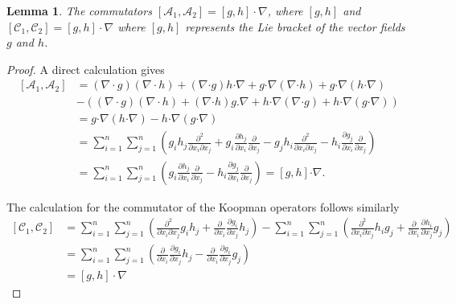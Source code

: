 \documentclass[pdflatex,sn-mathphys]{sn-jnl}%
\newtheorem{lemma}{Lemma}
\theoremstyle{thmstyleone}%
\theoremstyle{thmstyletwo}%
\theoremstyle{thmstylethree}%
\begin{document}
\begin{lemma}
The commutators $[\mathcal{A}_1,\mathcal{A}_2] = [g,h] \cdot \nabla$, where $[g,h]$ and $[\mathcal{C}_1,\mathcal{C}_2] = [g,h] \cdot \nabla$ where $[g,h]$ represents the Lie bracket of the vector fields $g$ and $h$.
\end{lemma}
\begin{proof} A direct calculation gives 
\begin{equation}
\begin{split}
[\mathcal{A}_1,\mathcal{A}_2] &=  (\nabla\cdot g)(\nabla \cdot h) + (\nabla \boldsymbol{\cdot} g) h \boldsymbol{\cdot} \nabla + g\boldsymbol{\cdot} \nabla(\nabla \boldsymbol{\cdot} h) + g \boldsymbol{\cdot} \nabla(h\boldsymbol{\cdot}  \nabla) \\
& -\left((\nabla\cdot g)(\nabla \cdot h) + (\nabla \boldsymbol{\cdot} h)g.\nabla + h \boldsymbol{\cdot} \nabla (\nabla \boldsymbol{\cdot} g) + h \boldsymbol{\cdot} \nabla (g \boldsymbol{\cdot} \nabla)\right) \\
& = g \boldsymbol{\cdot} \nabla(h\boldsymbol{\cdot}  \nabla) - h \boldsymbol{\cdot} \nabla (g \boldsymbol{\cdot} \nabla)\\
&=\sum_{i=1}^n\sum_{j=1}^n\left(g_ih_j \frac{\partial^2}{\partial x_i \partial x_j} +  g_i \frac{\partial h_j}{\partial x_i}\frac{\partial }{\partial x_j} - g_jh_i \frac{\partial^2}{\partial x_i \partial x_j} -  h_i \frac{\partial g_j}{\partial x_i}\frac{\partial }{\partial x_j} \right)\\
&=\sum_{i=1}^n\sum_{j=1}^n\left(g_i \frac{\partial h_j}{\partial x_i}\frac{\partial }{\partial x_j} -  h_i \frac{\partial g_j}{\partial x_i}\frac{\partial }{\partial x_j}\right) =[g,h] \boldsymbol{\cdot}   \nabla.
\end{split}
\end{equation}

The calculation for the commutator of the Koopman operators follows similarly 
\begin{equation}
\begin{split}
[\mathcal{C}_1,\mathcal{C}_2]  &=   \sum_{i=1}^n\sum_{j=1}^n \left( \frac{\partial^2 }{\partial x_i \partial x_j} g_i h_j + \frac{\partial }{\partial x_i}\frac{\partial g_i}{\partial x_j} h_j \right) - \sum_{i=1}^n\sum_{j=1}^n \left( \frac{\partial^2 }{\partial x_i \partial x_j} h_i g_j + \frac{\partial }{\partial x_i}\frac{\partial h_i}{\partial x_j} g_j \right) \\
&= \sum_{i=1}^n\sum_{j=1}^n \left( \frac{\partial }{\partial x_i}\frac{\partial g_i}{\partial x_j} h_j - \frac{\partial }{\partial x_i}\frac{\partial g_i}{\partial x_j} g_j   \right)\\
&=  [g,h] \cdot \nabla
\end{split}
\end{equation}
\end{proof}
\end{document}
